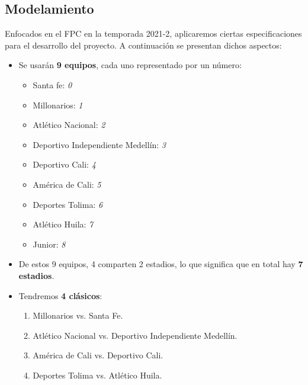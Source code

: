 \documentclass[11pt]{article}
\begin{document}
\begin{multicols}{2}
        \section{Modelamiento}
            Enfocados en el FPC en la temporada 2021-2, aplicaremos ciertas especificaciones para el desarrollo del proyecto. A continuación se presentan dichos aspectos:
            \begin{itemize}
                \item  Se usarán \textbf{9 equipos}, cada uno representado por un número:
                \begin{itemize}[label=$\diamond$]
                    \item Santa fe: \textit{0}
                    \item Millonarios: \textit{1}
                    \item Atlético Nacional: \textit{2}
                    \item Deportivo Independiente Medellín: \textit{3}
                    \item Deportivo Cali: \textit{4}
                    \item América de Cali: \textit{5}
                    \item Deportes Tolima: \textit{6}
                    \item Atlético Huila: \textit{7}
                    \item Junior: \textit{8}
                \end{itemize}  
                \item  De estos 9 equipos, 4 comparten 2 estadios, lo que significa que en total hay \textbf{7 estadios}.
                \item  Tendremos \textbf{4 clásicos}:
                \begin{enumerate}
                    \item  Millonarios vs. Santa Fe.
                    \item  Atlético Nacional vs. Deportivo Independiente Medellín.
                    \item  América de Cali vs. Deportivo Cali.
                    \item  Deportes Tolima  vs. Atlético Huila.
                \end{enumerate}
            \end{itemize}


\end{multicols}
\end{document}
